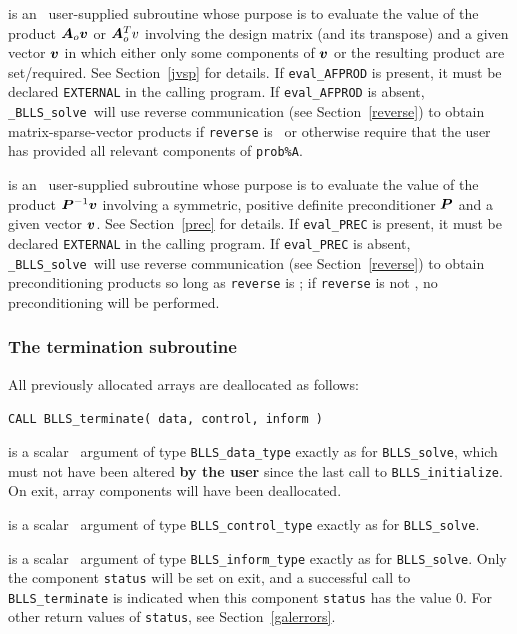 \documentclass{galahad}
\newcommand{\packagename}{BLLS}
\newcommand{\fullpackagename}{\libraryname\_\packagename}
\newcommand{\solver}{{\tt \fullpackagename\_solve}}
\begin{document}
\begin{description}
 is an \optional\
user-supplied subroutine whose purpose is to evaluate the value of the
product ${\bm{A}}_o {\bm{v}}$ or ${\bm{A}}_o^T v$ involving the design matrix 
(and its transpose)
and a given vector ${\bm{v}}$ in which either only some components of ${\bm{v}}$ or
the resulting product are set/required.
See Section~\ref{jvsp} for details.
If {\tt eval\_AFPROD} is present,
it must be declared {\tt EXTERNAL} in the calling program.
If {\tt eval\_AFPROD} is absent, \solver\ will use reverse communication
(see Section~\ref{reverse})
to obtain matrix-sparse-vector products if {\tt reverse} is \present\ or
otherwise require that the user has provided all relevant
components of {\tt prob\%A}.

 is an \optional\
user-supplied subroutine whose purpose is to evaluate the value of the
product ${\bm{P}}^{-1} {\bm{v}}$ involving a symmetric, positive definite 
preconditioner ${\bm{P}}$ and a given vector ${\bm{v}}$.
See Section~\ref{prec} for details.
If {\tt eval\_PREC} is present,
it must be declared {\tt EXTERNAL} in the calling program.
If {\tt eval\_PREC} is absent, \solver\ will use reverse communication
(see Section~\ref{reverse})
to obtain preconditioning products so long as {\tt reverse} is \present;
if {\tt reverse} is not \present, no preconditioning will be performed.

\end{description}


\subsubsection{The  termination subroutine}
All previously allocated arrays are deallocated as follows:
\vspace*{1mm}

\hspace{8mm}
{\tt CALL \packagename\_terminate( data, control, inform )}

\vspace*{-3mm}
\begin{description}

 is a scalar \intentinout\ argument of type
{\tt \packagename\_data\_type}
exactly as for
{\tt \packagename\_solve},
which must not have been altered {\bf by the user} since the last call to
{\tt \packagename\_initialize}.
On exit, array components will have been deallocated.

 is a scalar \intentin\ argument of type
{\tt \packagename\_control\_type}
exactly as for
{\tt \packagename\_solve}.

 is a scalar \intentout\ argument of type
{\tt \packagename\_inform\_type}
exactly as for
{\tt \packagename\_solve}.
Only the component {\tt status} will be set on exit, and a
successful call to
{\tt \packagename\_terminate}
is indicated when this  component {\tt status} has the value 0.
For other return values of {\tt status}, see Section~\ref{galerrors}.

\end{description}
\end{document}
